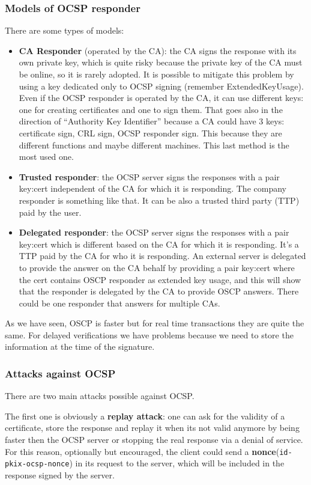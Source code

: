\subsubsection{Models of OCSP responder}
There are some types of models:
\begin{itemize}
  \item \textbf{CA Responder} (operated by the CA): the CA signs the
    response with its own private key, which is quite risky because
    the private key of the CA must be online, so it is rarely adopted.
    It is possible to mitigate this problem by using a key dedicated
    only to OCSP signing (remember ExtendedKeyUsage). Even if the OCSP
    responder is operated by the CA, it can use different keys: one
    for creating certificates and one to sign them. That goes also in
    the direction of “Authority Key Identifier” because a CA could
    have 3 keys: certificate sign, CRL sign, OCSP responder sign. This
    because they are different functions and maybe different machines.
    This last method is the most used one.
  \item \textbf{Trusted responder}: the OCSP server signs the
    responses with a pair key:cert independent of the CA for which it
    is responding. The company responder is something like that. It
    can be also a trusted third party (TTP) paid by the user.
  \item \textbf{Delegated responder}: the OCSP server signs the
    responses with a pair key:cert which is different based on the CA
    for which it is responding. It’s a TTP paid by the CA for who it is
    responding. An external server is delegated to provide the answer on
    the CA behalf by providing a pair key:cert where the cert contains
    OSCP responder as extended key usage, and this will show that the
    responder is delegated by the CA to provide OSCP answers. There
    could be one responder that answers for multiple CAs.
\end{itemize}
As we have seen, OSCP is faster but for real time transactions they
are quite the same. For delayed verifications we have problems because
we need to store the information at the time of the signature.
\subsubsection{Attacks against OCSP}
There are two main attacks possible against OCSP.

The first one is obviously a \textbf{replay attack}: one can ask for 
the validity of a certificate, store the response and replay it when
its not valid anymore by being faster then the OCSP server or stopping
the real response via a denial of service. For this reason, optionally
but encouraged, the client could send a
\textbf{nonce}(\texttt{id-pkix-ocsp-nonce}) in its request to the
server, which will be included in the response signed by the server.


